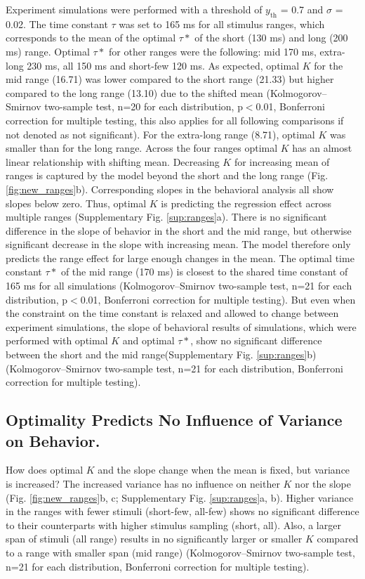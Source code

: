 \documentclass[10pt]{article}
\begin{document}
Experiment simulations were performed with a threshold of $y_{\text{th}}$ = 0.7 and $\sigma$ = 0.02. The time constant $\tau$  was set to 165 ms for all stimulus ranges, which corresponds to the mean of the optimal $\tau*$ of the short (130 ms) and long (200 ms) range. 
Optimal $\tau*$ for other ranges were the following: mid 170 ms, extra-long 230 ms, all 150 ms and short-few 120 ms. 
As expected, optimal $K$ for the mid range (16.71) was lower compared to the short range (21.33) but higher compared to the long range (13.10) due to the shifted mean 
(Kolmogorov–Smirnov two-sample test, n=20 for each distribution, p$<$0.01, Bonferroni correction for multiple testing, this also applies for all following comparisons if not denoted as not significant).
For the extra-long range (8.71), optimal $K$ was smaller than for the long range.
Across the four ranges optimal $K$ has an almost linear relationship with shifting mean.
Decreasing $K$ for increasing mean of ranges is captured by the model beyond the short and the long range (Fig. \ref{fig:new_ranges}b).
Corresponding slopes in the behavioral analysis all show slopes below zero. Thus, optimal $K$ is predicting the regression effect across multiple ranges (Supplementary Fig. \ref{sup:ranges}a). 
There is no significant difference in the slope of behavior in the short and the mid range, but otherwise significant decrease in the slope with increasing mean. The model therefore only predicts the range effect for large enough changes in the mean. 
The optimal time constant $\tau*$ of the mid range (170 ms) is closest to the shared time constant of 165 ms for all simulations
(Kolmogorov–Smirnov two-sample test, n=21 for each distribution, p$<$0.01, Bonferroni correction for multiple testing).
But even when the constraint on the time constant is relaxed and allowed to change between experiment simulations, the slope of behavioral results of simulations, which were performed with optimal $K$ and optimal $\tau*$, show no significant difference between the short and the mid range(Supplementary Fig. \ref{sup:ranges}b)
(Kolmogorov–Smirnov two-sample test, n=21 for each distribution, Bonferroni correction for multiple testing).

\subsection{Optimality Predicts No Influence of Variance on Behavior.}
How does optimal $K$ and the slope change when the mean is fixed, but variance is increased?
The increased variance has no influence on neither $K$ nor the slope (Fig. \ref{fig:new_ranges}b, c; Supplementary Fig. \ref{sup:ranges}a, b).
Higher variance in the ranges with fewer stimuli (short-few, all-few) shows no significant difference to their counterparts with higher stimulus sampling (short, all).
Also, a larger span of stimuli (all range) results in no significantly larger or smaller $K$ compared to a range with smaller span (mid range) 
(Kolmogorov–Smirnov two-sample test, n=21 for each distribution, Bonferroni correction for multiple testing).
\end{document}
